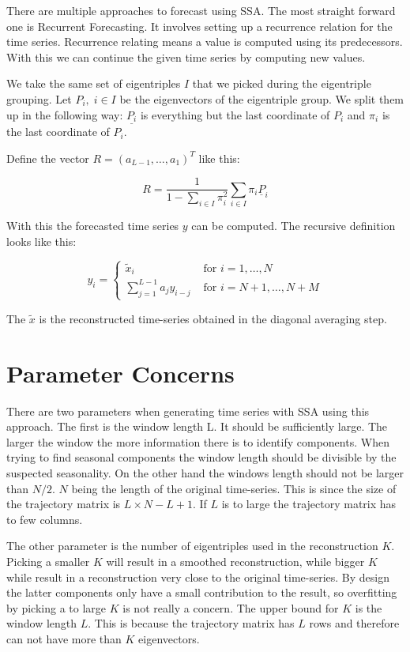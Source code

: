 There are multiple approaches to forecast using SSA. The most straight forward one is Recurrent Forecasting. It involves setting up a recurrence relation for the time series. Recurrence relating means a value is computed using its predecessors. With this we can continue the given time series by computing new values. 

We take the same set of eigentriples $I$ that we picked during the eigentriple grouping. Let $P_i, \; i \in I$ be the eigenvectors of the eigentriple group. We split them up in the following way: $\underline{P_i}$ is everything but the last coordinate of $P_i$ and $\pi_i$ is the last coordinate of $P_i$. 

Define the vector $R = (a_{L-1}, \dots, a_1)^T$ like this:

\begin{equation}
   R=\frac{1}{1-\sum_{i \in I} \pi_{i}^{2}} \sum_{i \in I} \pi_{i} \underline{P}_{i}
   \label{eq:r-def}
\end{equation}

With this the forecasted time series $y$ can be computed. The recursive definition looks like this:

\begin{equation}
  y_{i}=\left\{\begin{array}{ll}
\widetilde{x}_{i} & \text { for } i=1, \ldots, N \\
\sum_{j=1}^{L-1} a_{j} y_{i-j} & \text { for } i=N+1, \ldots, N+M
\end{array}\right. 
\end{equation}

The $\tilde{x}$ is the reconstructed time-series obtained in the diagonal averaging step. 

\section{Parameter Concerns}

There are two parameters when generating time series with SSA using this approach. The first is the window length L. It should be sufficiently large. The larger the window the more information there is to identify components. When trying to find seasonal components the window length should be divisible by the suspected seasonality. On the other hand the windows length should not be larger than $N/2$. $N$ being the length of the original time-series. This is since the size of the trajectory matrix is $L \times N-L+1$. If $L$ is to large the trajectory matrix has to few columns. 

The other parameter is the number of eigentriples used in the reconstruction $K$. Picking a smaller $K$ will result in a smoothed reconstruction, while bigger $K$ while result in a reconstruction very close to the original time-series. By design the latter components only have a small contribution to the result, so overfitting by picking a to large $K$ is not really a concern. The upper bound for $K$ is the window length $L$. This is because the trajectory matrix has $L$ rows and therefore can not have more than $K$ eigenvectors. 
